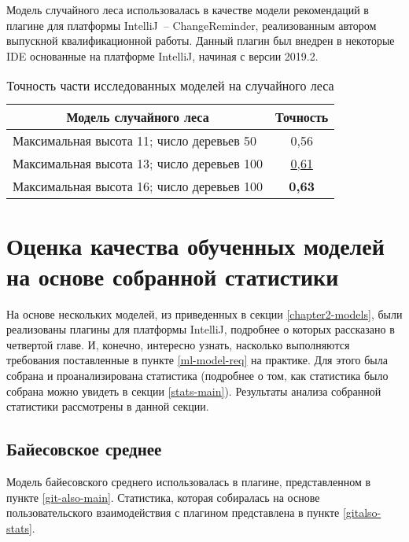 Модель случайного леса использовалась в качестве модели рекомендаций в плагине для платформы IntelliJ~-- ChangeReminder, реализованным автором выпускной квалификационной работы. Данный плагин был внедрен в некоторые IDE основанные на платформе IntelliJ, начиная с версии 2019.2.
        \begin{table}[!h]
        \caption{Точность части исследованных моделей на случайного леса}\label{rf-offline-result-table}
        \centering
        \begin{tabular}{|l|c|}\hline
        \multicolumn{1}{|c|}{\textbf{Модель случайного леса}} & \textbf{Точность}\\\hline
        Максимальная высота 11; число деревьев 50 & 0,56\\\hline
        Максимальная высота 13; число деревьев 100 & \uline{0,61} \\\hline
        Максимальная высота 16; число деревьев 100  & \textbf{0,63} \\\hline
        \end{tabular}
        \end{table}

\section{Оценка качества обученных моделей на основе собранной статистики}
На основе нескольких моделей, из приведенных в секции \ref{chapter2-models}, были реализованы плагины для платформы IntelliJ, подробнее о которых рассказано в четвертой главе. И, конечно, интересно узнать, насколько выполняются требования поставленные в пункте \ref{ml-model-req} на практике. Для этого была собрана и проанализирована статистика (подробнее о том, как статистика было собрана можно увидеть в секции \ref{stats-main}). Результаты анализа собранной статистики рассмотрены в данной секции.
    \subsection{Байесовское среднее}\label{bayes-quality-online}
Модель байесовского среднего использовалась в плагине, представленном в пункте \ref{git-also-main}. Статистика, которая собиралась на основе пользовательского взаимодействия с плагином представлена в пункте \ref{gitalso-stats}.

